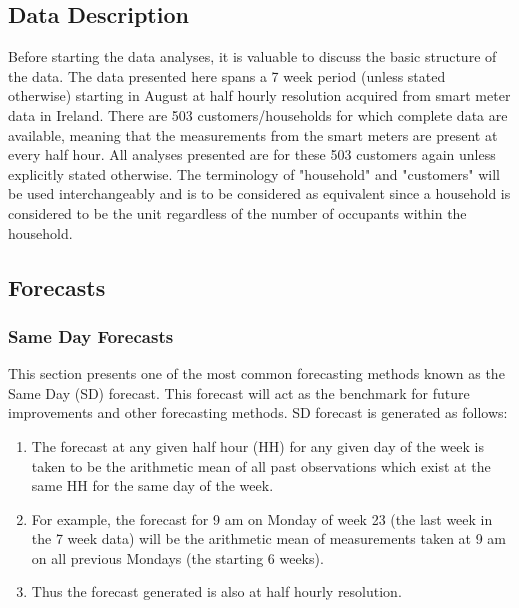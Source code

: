 \documentclass[a4paper]{article}
\begin{document}
\subsection{Data Description}
\label{subsec:DataDesc}
Before starting the data analyses, it is valuable to discuss the basic structure of the data. The data presented here spans a 7 week period (unless stated otherwise) starting in August at half hourly resolution acquired from smart meter data in Ireland. There are 503 customers/households for which complete data are available, meaning that the measurements from the smart meters are present at every half hour. All analyses presented are for these 503 customers again unless explicitly stated otherwise. The terminology of "household" and "customers" will be used interchangeably and is to be considered as equivalent since a household is considered to be the unit regardless of the number of occupants within the household.




\subsection{Forecasts}
\label{subsec:ForecastMethods}

\subsubsection{Same Day Forecasts} \label{subsubsec:sdforecast}
This section presents one of the most common forecasting methods known as the Same Day (SD) forecast. This forecast will act as the benchmark for future improvements and other forecasting methods. SD forecast is generated as follows:
\begin{enumerate}
\item The forecast at any given half hour (HH) for any given day of the week is taken to be the arithmetic mean of all past observations which exist at the same HH for the same day of the week.
\item For example, the forecast for 9 am on Monday of week 23 (the last week in the 7 week data) will be the arithmetic mean of measurements taken at 9 am on all previous Mondays (the starting 6 weeks).
\item Thus the forecast generated is also at half hourly resolution.
\end{enumerate}
\end{document}
